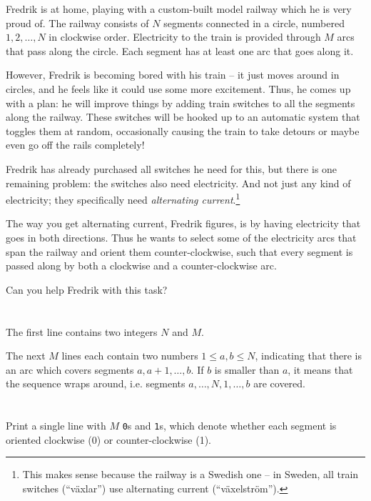 \def\version{jury-draft}
Fredrik is at home, playing with a custom-built model railway which he is very proud of.
The railway consists of $N$ segments connected in a circle, numbered $1, 2, \dots, N$ in clockwise order.
Electricity to the train is provided through $M$ arcs that pass along the
circle. Each segment has at least one arc that goes along it.

However, Fredrik is becoming bored with his train -- it just moves around in
circles, and he feels like it could use some more excitement.
Thus, he comes up with a plan: he will improve things by adding train switches
to all the segments along the railway. These switches will be hooked up to an
automatic system that toggles them at random, occasionally causing the train to
take detours or maybe even go off the rails completely!

Fredrik has already purchased all switches he need for this, but there is one
remaining problem: the switches also need electricity.
And not just any kind of electricity; they specifically need \emph{alternating current}.\footnote{This makes sense because the railway is a Swedish one -- in Sweden, all train switches (``växlar'') use alternating current (``växelström'').}

The way you get alternating current, Fredrik figures, is by having electricity
that goes in both directions. Thus he wants to select some of the electricity
arcs that span the railway and orient them counter-clockwise, such that every
segment is passed along by both a clockwise and a counter-clockwise arc.

Can you help Fredrik with this task?

\section*{}
The first line contains two integers $N$ and $M$.

The next $M$ lines each contain two numbers $1 \le a, b \le N$, indicating that
there is an arc which covers segments $a, a+1, \dots, b$. If $b$ is smaller
than $a$, it means that the sequence wraps around, i.e. segments
$a, \dots, N, 1, \dots, b$ are covered.

\section*{\outputsection}
Print a single line with $M$ \texttt{0}s and \texttt{1}s, which denote whether
each segment is oriented clockwise (0) or counter-clockwise (1).

